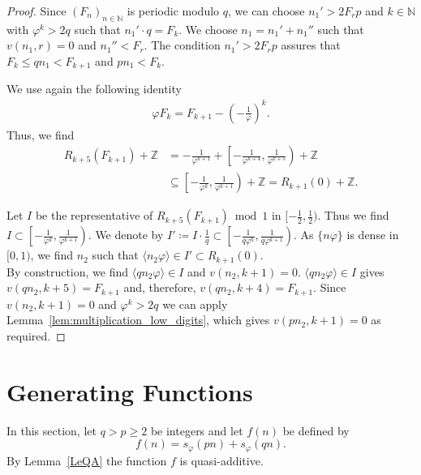 \documentclass[12pt]{amsart}
\begin{document}
\begin{proof}
  Since $(F_n)_{n\in \mathbb{N}}$ is periodic modulo $q$, we can choose $n_1' > 2 F_r p$ and $k\in \mathbb{N}$ with $\varphi^{k} > 2 q$ such that $n_1' \cdot q = F_k$.
  We choose $n_1 = n_1' + n_1''$ such that $v(n_1,r) = 0$ and $n_1'' < F_r$.
  The condition $n_1' > 2 F_r p$ assures that $F_k \leq q n_1 < F_{k+1}$ and $p n_1 < F_k$.
  
  
  We use again the following identity
  \begin{align*}
    \varphi F_k = F_{k+1} - \left( -\frac{1}{\varphi} \right)^{k}.
  \end{align*}
  Thus, we find
  \begin{align*}
    R_{k+5}(F_{k+1}) + {\mathbb{Z}}  &= -\frac{1}{\varphi^{k+1}} + \left[-\frac{1}{\varphi^{k+4}},\frac{1}{\varphi^{k+5}}\right) + {\mathbb{Z}}\\
&\subseteq \left[-\frac{1}{\varphi^{k}},\frac{1}{\varphi^{k+1}}\right) + {\mathbb{Z}} = R_{k+1}(0) + {\mathbb{Z}} .
  \end{align*}

  Let $I$ be the representative of $R_{k+5}(F_{k+1}) \bmod 1$ in $[-\frac{1}{2},\frac{1}{2})$.
  Thus we find $I \subset \left[-\frac{1}{\varphi^{k}},\frac{1}{\varphi^{k+1}}\right)$.
  We denote by $I' \coloneqq I \cdot \frac{1}{q} \subset \left[-\frac{1}{q \varphi^k}, \frac{1}{q \varphi^{k+1}}\right)$.
  As $\{n \varphi\}$ is dense in $[0,1)$, we find $n_2$ such that $\langle n_2 \varphi \rangle \in I' \subset R_{k+1}(0)$.\\
  By construction, we find $\langle q n_2 \varphi \rangle \in I$ and $v(n_2,k+1) = 0$.
  $\langle q n_2 \varphi \rangle \in I$ gives $v(q n_2, k+5) = F_{k+1}$ and, therefore, $v(q n_2, k+4) = F_{k+1}$.
  Since $v(n_2,k+1) = 0$ and $\varphi^k > 2q$ we can apply Lemma~\ref{lem:multiplication_low_digits}, which gives $v(p n_2,k+1) = 0$ as required.
\end{proof}

\section{Generating Functions}\label{sec3}
In this section, let $q>p \geq 2$ be integers and let $f(n)$ be defined by
\begin{equation}\label{eqDeffn}
f(n) = s_\varphi(pn) + s_\varphi(qn).
\end{equation}
By Lemma~\ref{LeQA} the function $f$ is quasi-additive.
\end{document}
